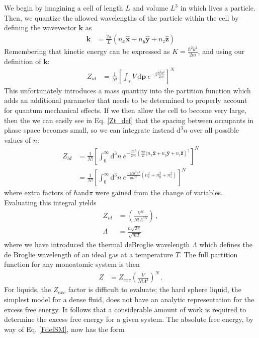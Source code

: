 \documentclass[12pt]{article}
\newcommand*{\diff}{\mathrm{d}}
\begin{document}
We begin by imagining a cell of length $L$ and volume $L^3$ in which lives a particle. Then, we quantize the allowed wavelengths of the particle within the cell by defining the wavevector $\mathbf{k}$ as
\begin{align}
    \mathbf{k} &= \frac{2\pi}{L}(n_x\mathbf{\hat{x}} + n_y\mathbf{\hat{y}} + n_z\mathbf{\hat{z}})
\end{align}
Remembering that kinetic energy can be expressed as $K = \frac{\hbar^2 k^2}{2m}$, and using our definition of $\mathbf{k}$:
\begin{align}
    Z_{id} &= \frac{1}{N!}\left[\int_s V\, \diff\mathbf{p} ~e^{-\beta \frac{\hbar^2 k^2}{2m}}\right]^{N}
    \label{Zt_def}
\end{align}
This unfortunately introduces a mass quantity into the partition function which adds an additional parameter that needs to be determined to properly account for quantum mechanical effects. If we then allow the cell to become very large, then the we can easily see in Eq. \ref{Zt_def} that the spacing between occupants in phase space becomes small, so we can integrate instead $\diff ^3 n$ over all possible values of $n$:
\begin{align}
    Z_{id} &= \frac{1}{N!}\left[\int_0^\infty \diff^3 n ~e^{-\frac{\beta \hbar^2}{2m} \left(\frac{2\pi}{L}(n_x\mathbf{\hat{x}} + n_y\mathbf{\hat{y}} + n_z\mathbf{\hat{z}}\right)^2}\right]^{N} \\
    &= \frac{1}{N!}\left[\int_0^\infty \diff^3 n ~e^{ \frac{-2\beta \hbar^2\pi^2}{mL^2}(n_x^2 + n_y^2 + n_z^2)}\right]^{N}
\end{align}
where extra factors of $\hbar $and$ \pi$ were gained from the change of variables. Evaluating this integral yields
\begin{align}
    Z_{id} &= \left(\frac{V^N}{N!\Lambda^{3N}}\right) \,, \\
    \Lambda &= \frac{\hbar\sqrt{2\pi}}{\sqrt{mT}}
\end{align}
where we have introduced the thermal deBroglie wavelength $\Lambda$ which defines the de Broglie wavelength of an ideal gas at a temperature $T$. The full partition function for any monoatomic system is then
\begin{align}
    Z &= Z_{exc} \left(\frac{V}{N!\Lambda^{3}}\right)^{N} \,.
\end{align}
For liquids, the $Z_{exc}$ factor is difficult to evaluate; the hard sphere liquid, the simplest model for a dense fluid, does not have an analytic representation for the excess free energy. It follows that a considerable amount of work is required to determine the excess free energy for a given system. The absolute free energy, by way of Eq. \ref{FdefSM}, now has the form
\end{document}
